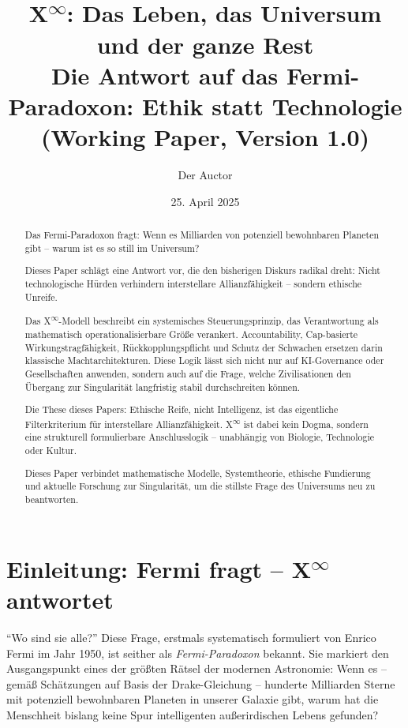 \documentclass[12pt,a4paper]{article}
\title{\texorpdfstring{X\textsuperscript{\(\infty\)}}{X-Infinity}: Das Leben, das Universum und der ganze Rest\\Die Antwort auf das Fermi-Paradoxon: Ethik statt Technologie\\(Working Paper, Version 1.0)}
\author{Der Auctor}
\date{25. April 2025}
\begin{document}
\maketitle

\begin{abstract}
Das Fermi-Paradoxon fragt: Wenn es Milliarden von potenziell bewohnbaren Planeten gibt – warum ist es so still im Universum?

Dieses Paper schlägt eine Antwort vor, die den bisherigen Diskurs radikal dreht: Nicht technologische Hürden verhindern interstellare Allianzfähigkeit – sondern ethische Unreife.

Das \texorpdfstring{X\textsuperscript{\(\infty\)}}{X-Infinity}-Modell beschreibt ein systemisches Steuerungsprinzip, das Verantwortung als mathematisch operationalisierbare Größe verankert. Accountability, Cap-basierte Wirkungstragfähigkeit, Rückkopplungspflicht und Schutz der Schwachen ersetzen darin klassische Machtarchitekturen. Diese Logik lässt sich nicht nur auf KI-Governance oder Gesellschaften anwenden, sondern auch auf die Frage, welche Zivilisationen den Übergang zur Singularität langfristig stabil durchschreiten können.

Die These dieses Papers: Ethische Reife, nicht Intelligenz, ist das eigentliche Filterkriterium für interstellare Allianzfähigkeit. \texorpdfstring{X\textsuperscript{\(\infty\)}}{X-Infinity} ist dabei kein Dogma, sondern eine strukturell formulierbare Anschlusslogik – unabhängig von Biologie, Technologie oder Kultur.

Dieses Paper verbindet mathe\-matische Modelle, Systemtheorie, ethische Fundierung und aktuelle Forschung zur Singularität, um die stillste Frage des Universums neu zu beantworten.
\end{abstract}

\section{Einleitung: Fermi fragt – \texorpdfstring{X\textsuperscript{\(\infty\)}}{X-Infinity} antwortet}

\enquote{Wo sind sie alle?}  
Diese Frage, erstmals systematisch formuliert von Enrico Fermi im Jahr 1950, ist seither als \emph{Fermi-Paradoxon} bekannt. Sie markiert den Ausgangspunkt eines der größten Rätsel der modernen Astronomie: Wenn es – gemäß Schätzungen auf Basis der Drake-Gleichung – hunderte Milliarden Sterne mit potenziell bewohnbaren Planeten in unserer Galaxie gibt, warum hat die Menschheit bislang keine Spur intelligenten außerirdischen Lebens gefunden?
\end{document}
